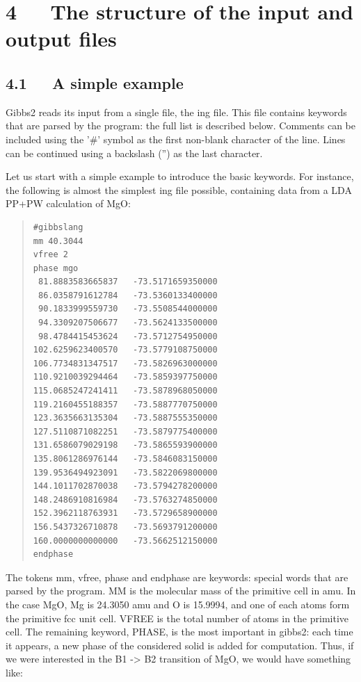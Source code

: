 \documentclass[a4paper]{article}
\begin{document}
\section{4   The structure of the input and output files%
  \label{the-structure-of-the-input-and-output-files}%
}


\subsection{4.1   A simple example%
  \label{a-simple-example}%
}

Gibbs2 reads its input from a single file, the ing file. This file
contains keywords that are parsed by the program: the full list is
described below. Comments can be included using the '\#' symbol as the
first non-blank character of the line. Lines can be continued using a
backslash ('') as the last character.

Let us start with a simple example to introduce the
basic keywords. For instance, the following is almost the simplest ing
file possible, containing data from a LDA PP+PW calculation of MgO:

\begin{quote}
\begin{verbatim}
#gibbslang
mm 40.3044
vfree 2
phase mgo
 81.8883583665837   -73.5171659350000
 86.0358791612784   -73.5360133400000
 90.1833999559730   -73.5508544000000
 94.3309207506677   -73.5624133500000
 98.4784415453624   -73.5712754950000
102.6259623400570   -73.5779108750000
106.7734831347517   -73.5826963000000
110.9210039294464   -73.5859397750000
115.0685247241411   -73.5878968050000
119.2160455188357   -73.5887770750000
123.3635663135304   -73.5887555350000
127.5110871082251   -73.5879775400000
131.6586079029198   -73.5865593900000
135.8061286976144   -73.5846083150000
139.9536494923091   -73.5822069800000
144.1011702870038   -73.5794278200000
148.2486910816984   -73.5763274850000
152.3962118763931   -73.5729658900000
156.5437326710878   -73.5693791200000
160.0000000000000   -73.5662512150000
endphase
\end{verbatim}
\end{quote}

The tokens mm, vfree, phase and endphase are keywords: special words
that are parsed by the program. MM is the molecular mass of the
primitive cell in amu. In the case MgO, Mg is 24.3050 amu and O is
15.9994, and one of each atoms form the primitive fcc unit cell. VFREE
is the total number of atoms in the primitive cell. The remaining
keyword, PHASE, is the most important in gibbs2: each time it appears,
a new phase of the considered solid is added for computation. Thus, if
we were interested in the B1 -> B2 transition of MgO, we would have
something like:
\end{document}
